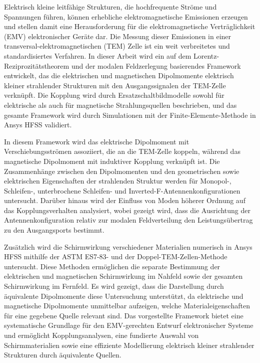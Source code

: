\documentclass[11pt]{article}
\numberwithin{equation}{section}
\numberwithin{figure}{section}
\numberwithin{table}{section}
\begin{document}
Elektrisch kleine leitfähige Strukturen, die hochfrequente Ströme und Spannungen führen, können erhebliche elektromagnetische Emissionen erzeugen und stellen damit eine Herausforderung für die elektromagnetische Verträglichkeit (EMV) elektronischer Geräte dar. Die Messung dieser Emissionen in einer transversal-elektromagnetischen (TEM) Zelle ist ein weit verbreitetes und standardisiertes Verfahren. In dieser Arbeit wird ein auf dem Lorentz-Reziprozitätstheorem und der modalen Feldzerlegung basierendes Framework entwickelt, das die elektrischen und magnetischen Dipolmomente elektrisch kleiner strahlender Strukturen mit den Ausgangssignalen der TEM-Zelle verknüpft. Die Kopplung wird durch Ersatzschaltbildmodelle sowohl für elektrische als auch für magnetische Strahlungsquellen beschrieben, und das gesamte Framework wird durch Simulationen mit der Finite-Elemente-Methode in Ansys HFSS validiert.

In diesem Framework wird das elektrische Dipolmoment mit Verschiebungsströmen assoziiert, die an die TEM-Zelle koppeln, während das magnetische Dipolmoment mit induktiver Kopplung verknüpft ist. Die Zusammenhänge zwischen den Dipolmomenten und den geometrischen sowie elektrischen Eigenschaften der strahlenden Struktur werden für Monopol-, Schleifen-, unterbrochene Schleifen- und Inverted-F-Antennenkonfigurationen untersucht. Darüber hinaus wird der Einfluss von Moden höherer Ordnung auf das Kopplungsverhalten analysiert, wobei gezeigt wird, dass die Ausrichtung der Antennenkonfiguration relativ zur modalen Feldverteilung den Leistungsübertrag zu den Ausgangsports bestimmt.

Zusätzlich wird die Schirmwirkung verschiedener Materialien numerisch in Ansys HFSS mithilfe der ASTM ES7-83- und der Doppel-TEM-Zellen-Methode untersucht. Diese Methoden ermöglichen die separate Bestimmung der elektrischen und magnetischen Schirmwirkung im Nahfeld sowie der gesamten Schirmwirkung im Fernfeld. Es wird gezeigt, dass die Darstellung durch äquivalente Dipolmomente diese Untersuchung unterstützt, da elektrische und magnetische Dipolmomente unmittelbar aufzeigen, welche Materialeigenschaften für eine gegebene Quelle relevant sind. Das vorgestellte Framework bietet eine systematische Grundlage für den EMV-gerechten Entwurf elektronischer Systeme und ermöglicht Kopplungsanalysen, eine fundierte Auswahl von Schirmmaterialien sowie eine effiziente Modellierung elektrisch kleiner strahlender Strukturen durch äquivalente Quellen.

\cleardoublepage
{}          %
\end{document}
